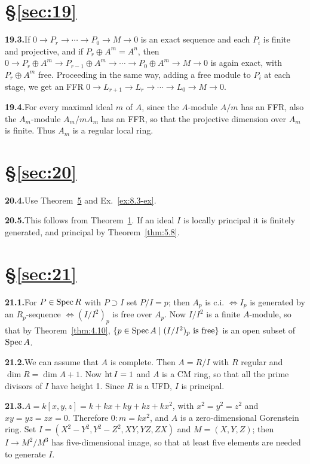 
\section*{\S\ref{sec:19}}

\noindent\textbf{19.3.}\quad If $0 \to P_r \to \cdots \to P_0 \to M \to 0$ is an exact sequence and each $P_i$ is finite
and projective, and if $P_r \oplus A^m = A^n$, then $0 \to P_r \oplus A^m \to P_{r-1} \oplus A^m \to \cdots \to P_0 \oplus A^m \to M \to 0$
is again exact, with $P_r \oplus A^m$ free. Proceeding in the same
way, adding a free module to $P_i$ at each stage, we get an FFR $0 \to L_{r+1}
\to L_r \to \cdots \to L_0 \to M \to 0$.

\noindent\textbf{19.4.}\quad For every maximal ideal $m$ of $A$, since the $A$-module $A/m$ has an FFR, also
the $A_m$-module $A_m/mA_m$ has an FFR, so that the projective dimension over
$A_m$ is finite. Thus $A_m$ is a regular local ring.

\section*{\S\ref{sec:20}}

\noindent\textbf{20.4.}\quad Use Theorem~\hyperref[thm:20.5]{5} and Ex.~\ref{ex:8.3-ex}.

\noindent\textbf{20.5.}\quad This follows from Theorem~\hyperref[thm:20.1]{1}. If an ideal $I$ is locally principal it is finitely
generated, and principal by Theorem~\ref{thm:5.8}.

\section*{\S\ref{sec:21}}

\noindent\textbf{21.1.}\quad For $P \in \operatorname{Spec} R$ with $P \supset I$ set $P/I = p$; then $A_p$ is c.i. $\iff I_p$ is generated by an
$R_p$-sequence $\iff (I/I^2)_p$ is free over $A_p$. Now $I/I^2$ is a finite $A$-module, so that
by Theorem~\ref{thm:4.10}, $\{p \in \operatorname{Spec} A \mid (I/I^2)_p \text{ is free}\}$ is an open subset of $\operatorname{Spec} A$.

\noindent\textbf{21.2.}\quad We can assume that $A$ is complete. Then $A = R/I$ with $R$ regular and
$\dim R = \dim A + 1$. Now $\operatorname{ht} I = 1$ and $A$ is a CM ring, so that all the prime
divisors of $I$ have height 1. Since $R$ is a UFD, $I$ is principal.

\noindent\textbf{21.3.}\quad $A = k[x, y, z] = k + kx + ky + kz + kx^2$, with $x^2 = y^2 = z^2$ and $xy = yz =
zx = 0$. Therefore $0:m = kx^2$, and $A$ is a zero-dimensional Gorenstein
ring. Set $I = (X^2 - Y^2, Y^2 - Z^2, XY, YZ, ZX)$ and $M = (X, Y, Z)$; then
$I \to M^2/M^3$ has five-dimensional image, so that at least five elements
are needed to generate $I$.
